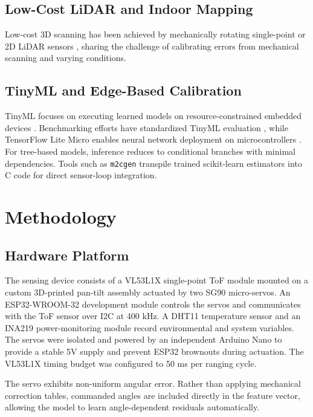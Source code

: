 \documentclass[conference, a4paper]{IEEEtran}
\begin{document}
\subsection{Low-Cost LiDAR and Indoor Mapping}
Low-cost 3D scanning has been achieved by mechanically rotating single-point or 2D LiDAR sensors \cite{willis2009design, fpga2019lowcost, low2024cost3d, jimenez20143d, kim2015design}, sharing the challenge of calibrating errors from mechanical scanning and varying conditions.

\subsection{TinyML and Edge-Based Calibration}
TinyML focuses on executing learned models on resource-constrained embedded devices \cite{hayajneh2024tinyml, wang2020tinyml, warden2019tinyml, lin2020mcunet}. Benchmarking efforts have standardized TinyML evaluation \cite{banbury2021benchmarking}, while TensorFlow Lite Micro enables neural network deployment on microcontrollers \cite{david2021tensorflow}. For tree-based models, inference reduces to conditional branches with minimal dependencies. Tools such as \texttt{m2cgen} transpile trained scikit-learn \cite{pedregosa2011scikit} estimators into C code for direct sensor-loop integration.

\section{Methodology}

\subsection{Hardware Platform}
The sensing device consists of a VL53L1X single-point ToF module \cite{stmicro2018vl53l1x} mounted on a custom 3D-printed pan-tilt assembly actuated by two SG90 micro-servos. An ESP32-WROOM-32 development module \cite{espressif2023esp32} controls the servos and communicates with the ToF sensor over I2C at 400 kHz. A DHT11 temperature sensor and an INA219 power-monitoring module record environmental and system variables. The servos were isolated and powered by an independent Arduino Nano to provide a stable 5V supply and prevent ESP32 brownouts during actuation. The VL53L1X timing budget was configured to 50 ms per ranging cycle.


The servo exhibits non-uniform angular error. Rather than applying mechanical correction tables, commanded angles are included directly in the feature vector, allowing the model to learn angle-dependent residuals automatically.
\end{document}
